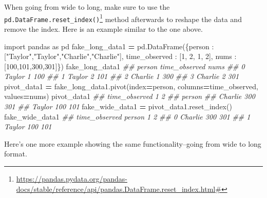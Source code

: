 \documentclass[
  12pt,
]{krantz}
\makeatletter
\newenvironment{Shaded}{\begin{snugshade}}{\end{snugshade}}
\newcommand{\CommentTok}[1]{\textcolor[rgb]{0.37,0.37,0.37}{\textit{#1}}}
\newcommand{\DecValTok}[1]{\textcolor[rgb]{0.06,0.06,0.06}{#1}}
\newcommand{\ImportTok}[1]{#1}
\newcommand{\NormalTok}[1]{#1}
\newcommand{\OperatorTok}[1]{\textcolor[rgb]{0.43,0.43,0.43}{\textbf{#1}}}
\newcommand{\StringTok}[1]{\textcolor[rgb]{0.5,0.5,0.5}{#1}}
\renewcommand{\href}[2]{#2\footnote{\url{#1}}}
\newenvironment{kframe}{%
\medskip{}
\setlength{\fboxsep}{.8em}
 \def\at@end@of@kframe{}%
 \ifinner\ifhmode%
  \def\at@end@of@kframe{\end{minipage}}%
  \begin{minipage}{\columnwidth}%
 \fi\fi%
 \def\FrameCommand##1{\hskip\@totalleftmargin \hskip-\fboxsep
 \colorbox{shadecolor}{##1}\hskip-\fboxsep
     \hskip-\linewidth \hskip-\@totalleftmargin \hskip\columnwidth}%
 \MakeFramed {\advance\hsize-\width
   \@totalleftmargin\z@ \linewidth\hsize
   \@setminipage}}%
 {\par\unskip\endMakeFramed%
 \at@end@of@kframe}
\renewenvironment{Shaded}{\begin{kframe}}{\end{kframe}}
\makeatother
\begin{document}
When going from wide to long, make sure to use the \href{https://pandas.pydata.org/pandas-docs/stable/reference/api/pandas.DataFrame.reset_index.html\#}{\texttt{pd.DataFrame.reset\_index()}} method afterwards to reshape the data and remove the index. Here is an example similar to the one above.

\begin{Shaded}
\begin{Highlighting}[]
\ImportTok{import}\NormalTok{ pandas }\ImportTok{as}\NormalTok{ pd}
\NormalTok{fake\_long\_data1 }\OperatorTok{=}\NormalTok{ pd.DataFrame(\{}\StringTok{\textquotesingle{}person\textquotesingle{}}\NormalTok{ : [}\StringTok{"Taylor"}\NormalTok{,}\StringTok{"Taylor"}\NormalTok{,}\StringTok{"Charlie"}\NormalTok{,}\StringTok{"Charlie"}\NormalTok{], }
                               \StringTok{\textquotesingle{}time\_observed\textquotesingle{}}\NormalTok{ : [}\DecValTok{1}\NormalTok{, }\DecValTok{2}\NormalTok{, }\DecValTok{1}\NormalTok{, }\DecValTok{2}\NormalTok{],}
                               \StringTok{\textquotesingle{}nums\textquotesingle{}}\NormalTok{ : [}\DecValTok{100}\NormalTok{,}\DecValTok{101}\NormalTok{,}\DecValTok{300}\NormalTok{,}\DecValTok{301}\NormalTok{]\})}
\NormalTok{fake\_long\_data1}
\CommentTok{\#\#     person  time\_observed  nums}
\CommentTok{\#\# 0   Taylor              1   100}
\CommentTok{\#\# 1   Taylor              2   101}
\CommentTok{\#\# 2  Charlie              1   300}
\CommentTok{\#\# 3  Charlie              2   301}
\NormalTok{pivot\_data1 }\OperatorTok{=}\NormalTok{ fake\_long\_data1.pivot(index}\OperatorTok{=}\StringTok{\textquotesingle{}person\textquotesingle{}}\NormalTok{, columns}\OperatorTok{=}\StringTok{\textquotesingle{}time\_observed\textquotesingle{}}\NormalTok{, values}\OperatorTok{=}\StringTok{\textquotesingle{}nums\textquotesingle{}}\NormalTok{)}
\NormalTok{pivot\_data1}
\CommentTok{\#\# time\_observed    1    2}
\CommentTok{\#\# person                 }
\CommentTok{\#\# Charlie        300  301}
\CommentTok{\#\# Taylor         100  101}
\NormalTok{fake\_wide\_data1 }\OperatorTok{=}\NormalTok{ pivot\_data1.reset\_index()}
\NormalTok{fake\_wide\_data1}
\CommentTok{\#\# time\_observed   person    1    2}
\CommentTok{\#\# 0              Charlie  300  301}
\CommentTok{\#\# 1               Taylor  100  101}
\end{Highlighting}
\end{Shaded}

Here's one more example showing the same functionality--going from wide to long format.
\end{document}
